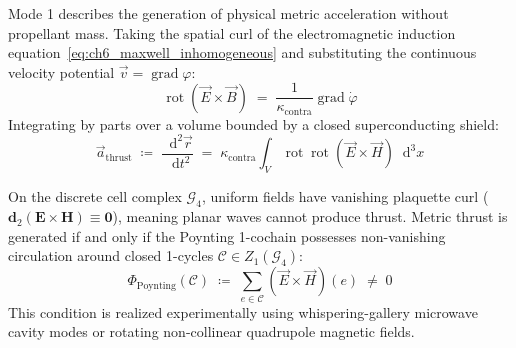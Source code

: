 \documentclass[
    12pt,
    a4paper,
    headings=normal,
    twoside=false,
    open=any,
    parskip=half
]{scrbook}
\newcommand{\diff}{\mathop{}\!\mathrm{d}}
\begin{document}
Mode 1 describes the generation of physical metric acceleration without propellant mass. Taking the spatial curl of the electromagnetic induction equation~\eqref{eq:ch6_maxwell_inhomogeneous} and substituting the continuous velocity potential $\vec{v} = \operatorname{grad}\varphi$:
\begin{equation}
\operatorname{rot}\left( \vec{E} \times \vec{B} \right) \;=\; \frac{1}{\kappa_{\text{contra}}} \operatorname{grad}\dot{\varphi}
\end{equation}
Integrating by parts over a volume bounded by a closed superconducting shield:
\begin{equation}
\vec{a}_{\text{thrust}} \;\coloneqq\; \frac{\diff^2\vec{r}}{\diff t^2} \;=\; \kappa_{\text{contra}} \int_V \operatorname{rot}\operatorname{rot}\left( \vec{E} \times \vec{H} \right) \diff^3 x
\label{eq:ch6_thrust_acceleration_formula}
\end{equation}

On the discrete cell complex $\mathcal{G}_4$, uniform fields have vanishing plaquette curl ($\mathbf{d}_2 (\mathbf{E} \times \mathbf{H}) \equiv \mathbf{0}$), meaning planar waves cannot produce thrust. Metric thrust is generated if and only if the Poynting 1-cochain possesses non-vanishing circulation around closed 1-cycles $\mathcal{C} \in Z_1(\mathcal{G}_4)$:
\begin{equation}
\Phi_{\text{Poynting}}(\mathcal{C}) \;\coloneqq\; \sum_{e \in \mathcal{C}} \left( \vec{E} \times \vec{H} \right)(e) \;\ne\; 0
\label{eq:ch6_non_zero_poynting_curl}
\end{equation}
This condition is realized experimentally using whispering-gallery microwave cavity modes or rotating non-collinear quadrupole magnetic fields.
\end{document}
